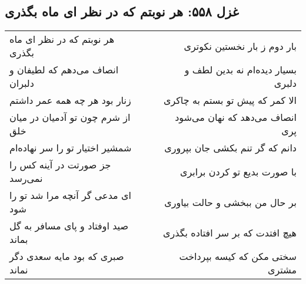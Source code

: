 \begin{center}
\section*{غزل ۵۵۸: هر نوبتم که در نظر ای ماه بگذری}
\label{sec:558}
\begin{longtable}{l p{0.5cm} r}
هر نوبتم که در نظر ای ماه بگذری
&&
بار دوم ز بار نخستین نکوتری
\\
انصاف می‌دهم که لطیفان و دلبران
&&
بسیار دیده‌ام نه بدین لطف و دلبری
\\
زنار بود هر چه همه عمر داشتم
&&
الا کمر که پیش تو بستم به چاکری
\\
از شرم چون تو آدمیان در میان خلق
&&
انصاف می‌دهد که نهان می‌شود پری
\\
شمشیر اختیار تو را سر نهاده‌ام
&&
دانم که گر تنم بکشی جان بپروری
\\
جز صورتت در آینه کس را نمی‌رسد
&&
با صورت بدیع تو کردن برابری
\\
ای مدعی گر آنچه مرا شد تو را شود
&&
بر حال من ببخشی و حالت بیاوری
\\
صید اوفتاد و پای مسافر به گل بماند
&&
هیچ افتدت که بر سر افتاده بگذری
\\
صبری که بود مایه سعدی دگر نماند
&&
سختی مکن که کیسه بپرداخت مشتری
\\
\end{longtable}
\end{center}
